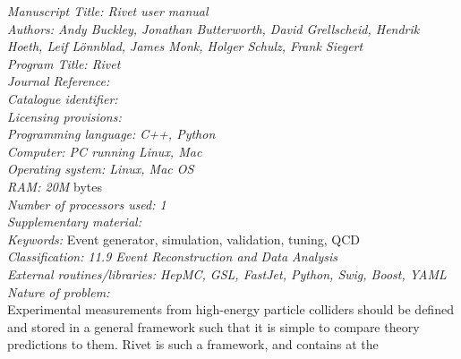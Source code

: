 \documentclass[preprint,12pt]{elsarticle}
\begin{document}
\begin{small}
  \noindent
  {\em Manuscript Title: Rivet user manual}\\
  {\em Authors: Andy Buckley, Jonathan Butterworth, David Grellscheid,
  Hendrik Hoeth, Leif L\"onnblad, James Monk, Holger Schulz, Frank Siegert}\\
  {\em Program Title: Rivet}\\
  {\em Journal Reference:}                                      \\
  {\em Catalogue identifier:}                                   \\
  {\em Licensing provisions:}                                   \\
  {\em Programming language: C++, Python}\\
  {\em Computer: PC running Linux, Mac}\\
  {\em Operating system: Linux, Mac OS}\\
  {\em RAM: 20M} bytes\\
  {\em Number of processors used: 1}                              \\
  {\em Supplementary material:}                                 \\
  {\em Keywords:} Event generator, simulation, validation, tuning, QCD  \\
  {\em Classification: 11.9 Event Reconstruction and Data Analysis}\\
  {\em External routines/libraries: HepMC, GSL, FastJet, Python, Swig, Boost, YAML}\\
  {\em Nature of problem:}\\
  Experimental measurements from high-energy particle colliders should be
  defined and stored in a general framework such that it is simple to compare
  theory predictions to them. Rivet is such a framework, and contains at the

\end{small}
\end{document}
